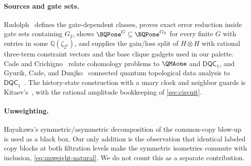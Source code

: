 \paragraph{Sources and gate sets.}
Rudolph~\cite{rudolph2026universal} defines the gate-dependent classes,
proves exact error reduction inside gate sets containing \(G_2\), shows
\(\BQPone^{G}\subseteq\BQPone^{G_2}\) for every finite \(G\) with entries in
some \(\mathbb Q(\zeta_{2^k})\), and supplies the gain/loss split of
\(H\otimes H\) with rational three-term constraint vectors and the base
clique gadgets used in our palette.  Cade and
Crichigno~\cite{cade2024complexity} relate cohomology problems to
\(\QMAone\) and \(\mathsf{DQC}_1\), and Gyurik, Cade, and
Dunjko~\cite{gyurik2022towards} connected quantum topological data analysis
to \(\mathsf{DQC}_1\)~\cite{knill1998power}.  The history-state construction
with a unary clock and neighbor guards is
Kitaev's~\cite{kitaev2002classical,kempe2006complexity}, with the rational
amplitude bookkeeping of \cref{sec:circuit}.

\paragraph{Unweighting.}
Hayakawa's symmetric/asymmetric decomposition of the common-copy
blow-up~\cite[Lemma~4.2 and Theorem~4.3]{hayakawa2026unweighted} is used as a
black box.  Our only addition is the observation that identical labeled copy
blocks at both filtration levels make the symmetric isometries commute with
inclusion, \cref{eq:unweight-natural}.  We do not count this as a separate
contribution.

